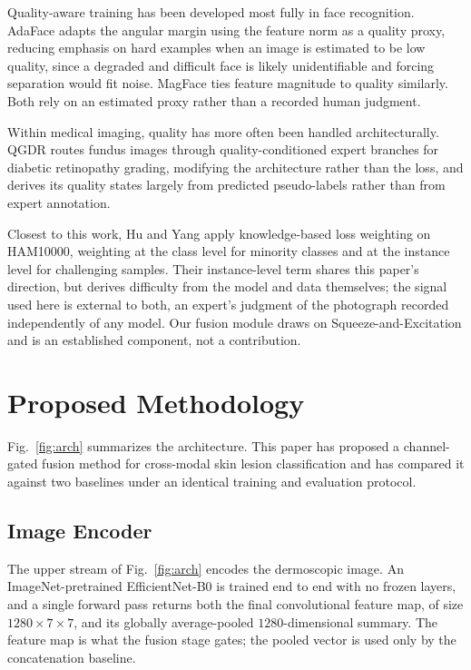 \documentclass[conference]{IEEEtran}
\begin{document}
Quality-aware training has been developed most fully in face recognition. AdaFace \cite{adaface} adapts the angular margin using the feature norm as a quality proxy, reducing emphasis on hard examples when an image is estimated to be low quality, since a degraded and difficult face is likely unidentifiable and forcing separation would fit noise. MagFace \cite{magface} ties feature magnitude to quality similarly. Both rely on an estimated proxy rather than a recorded human judgment.

Within medical imaging, quality has more often been handled architecturally. QGDR \cite{qgdr} routes fundus images through quality-conditioned expert branches for diabetic retinopathy grading, modifying the architecture rather than the loss, and derives its quality states largely from predicted pseudo-labels rather than from expert annotation.

Closest to this work, Hu and Yang \cite{hu2023} apply knowledge-based loss weighting on HAM10000, weighting at the class level for minority classes and at the instance level for challenging samples. Their instance-level term shares this paper's direction, but derives difficulty from the model and data themselves; the signal used here is external to both, an expert's judgment of the photograph recorded independently of any model. Our fusion module draws on Squeeze-and-Excitation \cite{se} and is an established component, not a contribution.

\section{Proposed Methodology}
Fig.~\ref{fig:arch} summarizes the architecture. This paper has proposed a channel-gated fusion method for cross-modal skin lesion classification and has compared it against two baselines under an identical training and evaluation protocol.

\subsection{Image Encoder}
\label{sec:arch}
The upper stream of Fig.~\ref{fig:arch} encodes the dermoscopic image. An ImageNet-pretrained EfficientNet-B0 \cite{efficientnet,imagenet} is trained end to end with no frozen layers, and a single forward pass returns both the final convolutional feature map, of size $1280 \times 7 \times 7$, and its globally average-pooled $1280$-dimensional summary. The feature map is what the fusion stage gates; the pooled vector is used only by the concatenation baseline.
\end{document}
